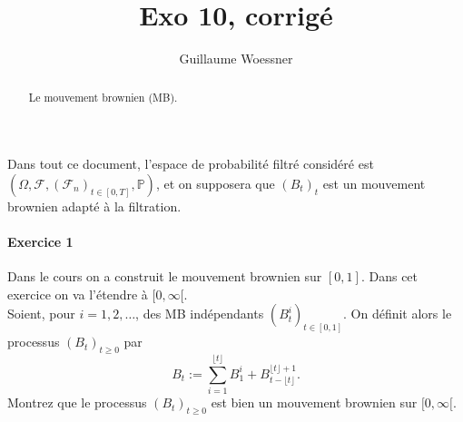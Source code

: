 \documentclass{article}
\title{Exo 10, corrigé}
\author{Guillaume Woessner}
\date{}                       %
\theoremstyle{definition}
\numberwithin{equation}{section}
\begin{document}
\maketitle                    %

\begin{abstract}
\begin{center}
Le mouvement brownien (MB).
\end{center}
\end{abstract}



Dans tout ce document, l'espace de probabilité filtré considéré est $(\Omega,\mathcal{F},(\mathcal{F}_n)_{t\in[0,T]},\mathbb{P})$, et on supposera que $(B_t)_t$ est un mouvement brownien adapté à la filtration.


\paragraph{Exercice 1}
Dans le cours on a construit le mouvement brownien sur $[0,1]$. Dans cet exercice on va l'étendre à $[0,\infty[$.\\
Soient, pour $i=1,2,\dots$, des MB indépendants $(B_t^i)_{t\in[0,1]}$. On définit alors le processus $(B_t)_{t\geq 0}$ par 
$$ B_t := \sum_{i=1}^{\lfloor t \rfloor} B^i_1 + B^{\lfloor t \rfloor + 1}_{t-\lfloor t \rfloor}. $$
Montrez que le processus $(B_t)_{t\geq 0}$ est bien un mouvement brownien sur $[0,\infty[$.
\end{document}
